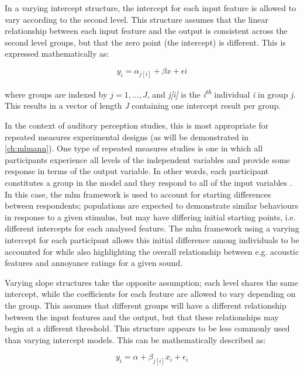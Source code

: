 In a varying intercept structure, the intercept for each input feature is allowed to vary according to the second level. This structure assumes that the linear relationship between each input feature and the output is consistent across the second level groups, but that the zero point (the intercept) is different. This is expressed mathematically \citep{DataAnalysisUsingGelman} as:

\begin{equation}
  y_i = \alpha_{j[i]} + \beta x + \epsilon{i}
\end{equation}

where groups are indexed by $j = 1, \ldots, J$, and \emph{j[i]} is the \emph{i\textsuperscript{th}} individual \emph{i} in group \emph{j}. This results in a vector of length \emph{J} containing one intercept result per group.

In the context of auditory perception studies, this is most appropriate for repeated measures experimental designs (as will be demonstrated in \cref{ch:mlmann}). One type of repeated measures studies is one in which all participants experience all levels of the independent variables and provide some response in terms of the output variable. In other words, each participant constitutes a group in the model and they respond to all of the input variables \citep{Kristjansson2007Multilevel}. In this case, the \gls{mlm} framework is used to account for starting differences between respondents; populations are expected to demonstrate similar behaviours in response to a given stimulus, but may have differing initial starting points, i.e. different intercepts for each analysed feature. The \gls{mlm} framework using a varying intercept for each participant allows this initial difference among individuals to be accounted for while also highlighting the overall relationship between e.g. acoustic features and annoyance ratings for a given sound. 

Varying slope structures take the opposite assumption; each level shares the same intercept, while the coefficients for each feature are allowed to vary depending on the group. This assumes that different groups will have a different relationship between the input features and the output, but that these relationships may begin at a different threshold. This structure appears to be less commonly used than varying intercept models. This can be mathematically described as:

\begin{equation}
  y_i = \alpha + \beta_{j[i]}x_i + \epsilon_i
\end{equation}

